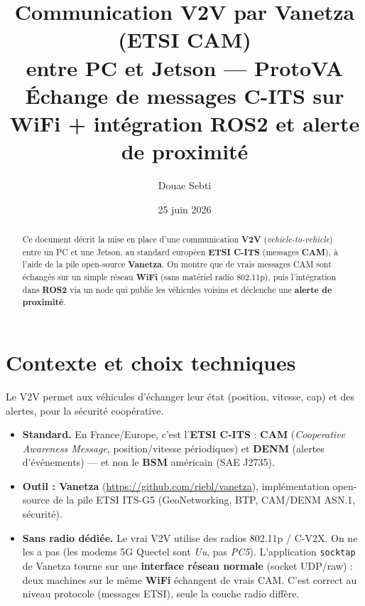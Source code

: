 \documentclass[a4paper,11pt]{article}
\title{\textbf{Communication V2V par Vanetza (ETSI CAM)\\ entre PC et Jetson --- ProtoVA}\\[2mm]
\large Échange de messages C-ITS sur WiFi + intégration ROS2 et alerte de proximité}
\author{Douae Sebti}
\date{25 juin 2026}
\begin{document}
\maketitle

\begin{abstract}
\noindent Ce document décrit la mise en place d'une communication \textbf{V2V}
(\emph{vehicle-to-vehicle}) entre un PC et une Jetson, au standard européen
\textbf{ETSI C-ITS} (messages \textbf{CAM}), à l'aide de la pile open-source
\textbf{Vanetza}. On montre que de vrais messages CAM sont échangés sur un simple
réseau \textbf{WiFi} (sans matériel radio 802.11p), puis l'intégration dans
\textbf{ROS2} via un node qui publie les véhicules voisins et déclenche une
\textbf{alerte de proximité}.
\end{abstract}

\tableofcontents
\bigskip

\section{Contexte et choix techniques}
Le V2V permet aux véhicules d'échanger leur état (position, vitesse, cap) et des
alertes, pour la sécurité coopérative.
\begin{itemize}[leftmargin=1.4em]
  \item \textbf{Standard.} En France/Europe, c'est l'\textbf{ETSI C-ITS} :
        \textbf{CAM} (\emph{Cooperative Awareness Message}, position/vitesse
        périodiques) et \textbf{DENM} (alertes d'événements) --- et non le
        \textbf{BSM} américain (SAE J2735).
  \item \textbf{Outil : Vanetza} (\url{https://github.com/riebl/vanetza}),
        implémentation open-source de la pile ETSI ITS-G5 (GeoNetworking, BTP,
        CAM/DENM ASN.1, sécurité).
  \item \textbf{Sans radio dédiée.} Le vrai V2V utilise des radios 802.11p /
        C-V2X. On ne les a pas (les modems 5G Quectel sont \emph{Uu}, pas
        \emph{PC5}). L'application \texttt{socktap} de Vanetza tourne sur une
        \textbf{interface réseau normale} (socket UDP/raw) : deux machines sur le
        même \textbf{WiFi} échangent de vrais CAM. C'est correct au niveau
        protocole (messages ETSI), seule la couche radio diffère.
\end{itemize}
\end{document}
